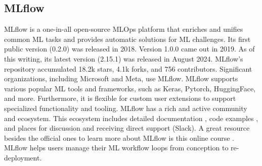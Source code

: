 \subsection{MLflow}

MLflow \cite{mlflow:homepage} is a one-in-all open-source MLOps platform that enriches and unifies common ML tasks and provides automatic solutions for ML challenges.
Its first public version (0.2.0) was released in 2018.
Version 1.0.0 came out in 2019.
As of this writing, its latest version (2.15.1) was released in August 2024.
MLflow's repository \cite{mlflow:github} accumulated 18.2k stars, 4.1k forks, and 756 contributors.
Significant organizations, including Microsoft and Meta, use MLflow.
MLflow supports various popular ML tools and frameworks, such as Keras, Pytorch, HuggingFace, and more.
Furthermore, it is flexible for custom user extensions to support specialized functionality and tooling.
MLflow has a rich and active community and ecosystem.
This ecosystem includes detailed documentation \cite{mlflow:docs}, code examples \cite{mlflow:examples}, and places for discussion and receiving direct support (Slack).
A great resource besides the official ones to learn more about MLflow is this online course \cite{mlflow:udemy}.
MLflow helps users manage their ML workflow loops from conception to re-deployment.

